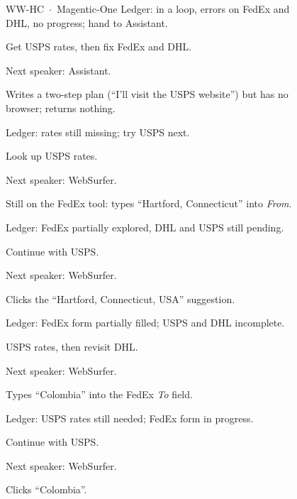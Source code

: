 \begin{figure}[p]
\begin{minipage}{\textwidth}
\begin{qbox}{\textsc{WW-HC} \,$\cdot$\, Magentic-One}
Ledger: in a loop, errors on FedEx and DHL, no progress; hand to Assistant.

Get USPS rates, then fix FedEx and DHL.

Next speaker: Assistant.

Writes a two-step plan (``I'll visit the USPS website'') but has no browser; returns nothing.

Ledger: rates still missing; try USPS next.

Look up USPS rates.

Next speaker: WebSurfer.

Still on the FedEx tool: types ``Hartford, Connecticut'' into \textit{From}.

Ledger: FedEx partially explored, DHL and USPS still pending.

Continue with USPS.

Next speaker: WebSurfer.

Clicks the ``Hartford, Connecticut, USA'' suggestion.

Ledger: FedEx form partially filled; USPS and DHL incomplete.

USPS rates, then revisit DHL.

Next speaker: WebSurfer.

Types ``Colombia'' into the FedEx \textit{To} field.

Ledger: USPS rates still needed; FedEx form in progress.

Continue with USPS.

Next speaker: WebSurfer.

Clicks ``Colombia''.


\end{qbox}
\end{minipage}
\end{figure}
